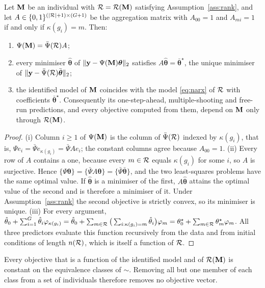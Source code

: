\begin{theorem}\label{thm:invariance}
Let $\mathbf{M}$ be an individual with $\mathcal{R}=\mathcal{R}(\mathbf{M})$ satisfying Assumption~\ref{ass:rank}, and let
$A\in\{0,1\}^{(|\mathcal{R}|+1)\times(G+1)}$ be the aggregation matrix with $A_{00}=1$ and $A_{mi}=1$ if and only if
$\kappa(g_i)=m$. Then:
\begin{enumerate}
\item[(i)] $\Psi(\mathbf{M})=\bar\Psi(\mathcal{R})A$;
\item[(ii)] every minimiser $\hat{\boldsymbol\theta}$ of $\|\mathbf y-\Psi(\mathbf{M})\boldsymbol\theta\|_2$ satisfies
$A\hat{\boldsymbol\theta}=\bar{\boldsymbol\theta}^\star$, the unique minimiser of
$\|\mathbf y-\bar\Psi(\mathcal{R})\bar{\boldsymbol\theta}\|_2$;
\item[(iii)] the identified model of $\mathbf{M}$ coincides with the model \eqref{eq:narx} of $\mathcal{R}$ with coefficients
$\bar{\boldsymbol\theta}^\star$. Consequently its one-step-ahead, multiple-shooting and free-run predictions, and
every objective computed from them, depend on $\mathbf{M}$ only through $\mathcal{R}(\mathbf{M})$.
\end{enumerate}
\end{theorem}
\begin{proof}
(i) Column $i\ge1$ of $\Psi(\mathbf{M})$ is the column of $\bar\Psi(\mathcal{R})$ indexed by $\kappa(g_i)$, that is,
$\Psi e_i=\bar\Psi e_{\kappa(g_i)}=\bar\Psi Ae_i$; the constant columns agree because $A_{00}=1$.
(ii) Every row of $A$ contains a one, because every $m\in\mathcal{R}$ equals $\kappa(g_i)$ for some $i$, so $A$ is
surjective. Hence $\{\Psi\boldsymbol\theta\}=\{\bar\Psi A\boldsymbol\theta\}=\{\bar\Psi\bar{\boldsymbol\theta}\}$,
and the two least-squares problems have the same optimal value. If $\hat{\boldsymbol\theta}$ is a minimiser of the
first, $A\hat{\boldsymbol\theta}$ attains the optimal value of the second and is therefore a minimiser of it. Under
Assumption~\ref{ass:rank} the second objective is strictly convex, so its minimiser is unique.
(iii) For every argument,
$\hat\theta_0+\sum_{i=1}^{G}\hat\theta_i\varphi_{\kappa(g_i)}=\hat\theta_0+\sum_{m\in\mathcal{R}}\big(\sum_{i:\kappa(g_i)=m}\hat\theta_i\big)\varphi_m
=\theta^\star_0+\sum_{m\in\mathcal{R}}\theta^\star_m\varphi_m$. All three predictors evaluate this function recursively from
the data and from initial conditions of length $n(\mathcal{R})$, which is itself a function of $\mathcal{R}$.
\end{proof}

\begin{corollary}\label{cor:classes}
Every objective that is a function of the identified model and of $\mathcal{R}(\mathbf{M})$ is constant on the equivalence classes
of $\sim$. Removing all but one member of each class from a set of individuals therefore removes no objective vector.
\end{corollary}

